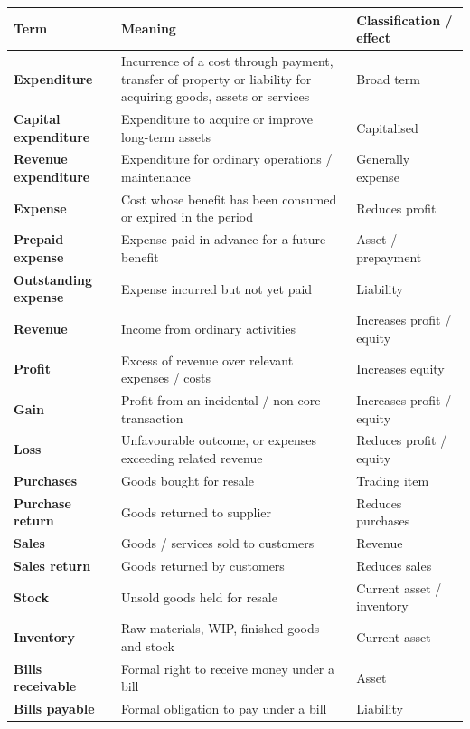 \documentclass[11pt,a4paper]{article}
\begin{document}
\begin{center}
\footnotesize
\begin{tabularx}{\textwidth}{@{}l Y l@{}}
\toprule
{}\textbf{Term} & \textbf{Meaning} & \textbf{Classification / effect}\\
\midrule
\textbf{Expenditure} & Incurrence of a cost through payment, transfer of property or liability for acquiring goods, assets or services & Broad term\\
\textbf{Capital expenditure} & Expenditure to acquire or improve long-term assets & Capitalised\\
\textbf{Revenue expenditure} & Expenditure for ordinary operations / maintenance & Generally expense\\
\textbf{Expense} & Cost whose benefit has been consumed or expired in the period & Reduces profit\\
\textbf{Prepaid expense} & Expense paid in advance for a future benefit & Asset / prepayment\\
\textbf{Outstanding expense} & Expense incurred but not yet paid & Liability\\
\textbf{Revenue} & Income from ordinary activities & Increases profit / equity\\
\textbf{Profit} & Excess of revenue over relevant expenses / costs & Increases equity\\
\textbf{Gain} & Profit from an incidental / non-core transaction & Increases profit / equity\\
\textbf{Loss} & Unfavourable outcome, or expenses exceeding related revenue & Reduces profit / equity\\
\textbf{Purchases} & Goods bought for resale & Trading item\\
\textbf{Purchase return} & Goods returned to supplier & Reduces purchases\\
\textbf{Sales} & Goods / services sold to customers & Revenue\\
\textbf{Sales return} & Goods returned by customers & Reduces sales\\
\textbf{Stock} & Unsold goods held for resale & Current asset / inventory\\
\textbf{Inventory} & Raw materials, WIP, finished goods and stock & Current asset\\
\textbf{Bills receivable} & Formal right to receive money under a bill & Asset\\
\textbf{Bills payable} & Formal obligation to pay under a bill & Liability\\

\end{tabularx}
\end{center}
\end{document}

